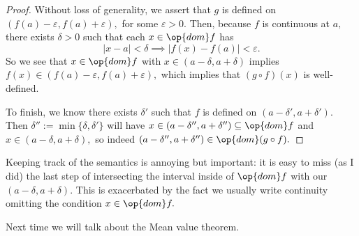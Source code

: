 \documentclass[../notes.tex]{subfiles}
\begin{document}
\begin{proof}
	Without loss of generality, we assert that $g$ is defined on $(f(a)-\varepsilon,f(a)+\varepsilon),$ for some $\varepsilon>0.$ Then, because $f$ is continuous at $a,$ there exists $\delta>0$ such that each $x\in\op{dom}f$ has
	\[|x-a|<\delta\implies|f(x)-f(a)|<\varepsilon.\]
	So we see that $x\in\op{dom}f$ with $x\in(a-\delta,a+\delta)$ implies $f(x)\in(f(a)-\varepsilon,f(a)+\varepsilon),$ which implies that $(g\circ f)(x)$ is well-defined.

	To finish, we know there exists $\delta'$ such that $f$ is defined on $(a-\delta',a+\delta').$ Then $\delta'':=\min\{\delta,\delta'\}$ will have $x\in(a-\delta'',a+\delta'')\subseteq\op{dom}f$ and $x\in(a-\delta,a+\delta),$ so indeed $(a-\delta'',a+\delta'')\in\op{dom}(g\circ f).$
\end{proof}
\begin{remark}
	Keeping track of the semantics is annoying but important: it is easy to miss (as I did) the last step of intersecting the interval inside of $\op{dom}f$ with our $(a-\delta,a+\delta).$ This is exacerbated by the fact we usually write continuity omitting the condition $x\in\op{dom}f.$
\end{remark}
Next time we will talk about the Mean value theorem.
\end{document}
